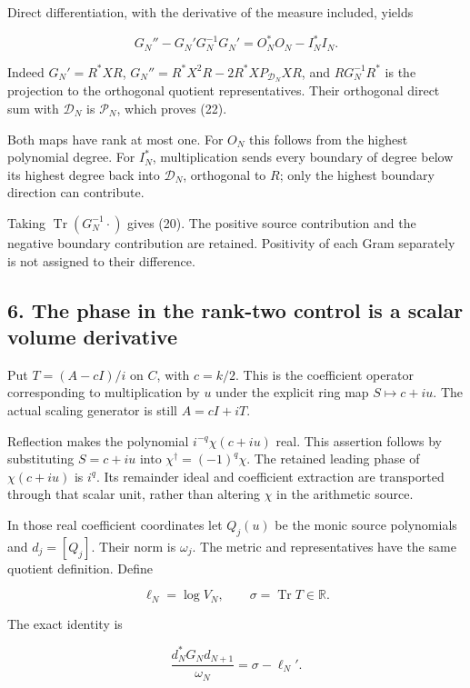 Direct differentiation, with the derivative of the measure included,
yields

\[
\boxed{G_N''-G_N'G_N^{-1}G_N'=O_N^*O_N-I_N^*I_N.}
\tag{22}
\]

Indeed \(G_N'=R^*XR\), \(G_N''=R^*X^2R-2R^*XP_{\mathcal D_N}XR\), and
\(RG_N^{-1}R^*\) is the projection to the orthogonal quotient
representatives. Their orthogonal direct sum with \(\mathcal D_N\) is
\(\mathcal P_N\), which proves (22).

Both maps have rank at most one. For \(O_N\) this follows from the
highest polynomial degree. For \(I_N^*\), multiplication sends every
boundary of degree below its highest degree back into \(\mathcal D_N\),
orthogonal to \(R\); only the highest boundary direction can contribute.

Taking \(\operatorname{Tr}(G_N^{-1}\cdot)\) gives (20). The positive
source contribution and the negative boundary contribution are retained.
Positivity of each Gram separately is not assigned to their difference.

\subsection{6. The phase in the rank-two control is a scalar volume
derivative}\label{toda_volume:the-phase-in-the-rank-two-control-is-a-scalar-volume-derivative}

Put \(T=(A-cI)/i\) on \(C\), with \(c=k/2\). This is the coefficient
operator corresponding to multiplication by \(u\) under the explicit
ring map \(S\mapsto c+iu\). The actual scaling generator is still
\(A=cI+iT\).

Reflection makes the polynomial \(i^{-q}\chi(c+iu)\) real. This
assertion follows by substituting \(S=c+iu\) into
\(\chi^\dagger=(-1)^q\chi\). The retained leading phase of
\(\chi(c+iu)\) is \(i^q\). Its remainder ideal and coefficient
extraction are transported through that scalar unit, rather than
altering \(\chi\) in the arithmetic source.

In those real coefficient coordinates let \(Q_j(u)\) be the monic source
polynomials and \(d_j=[Q_j]\). Their norm is \(\omega_j\). The metric
and representatives have the same quotient definition. Define

\[
\ell_N=\log V_N,\qquad \sigma=\operatorname{Tr}T\in\mathbb R.
\]

The exact identity is

\[
\boxed{\frac{d_N^*G_Nd_{N+1}}{\omega_N}=\sigma-\ell_N'.}
\tag{23}
\]

